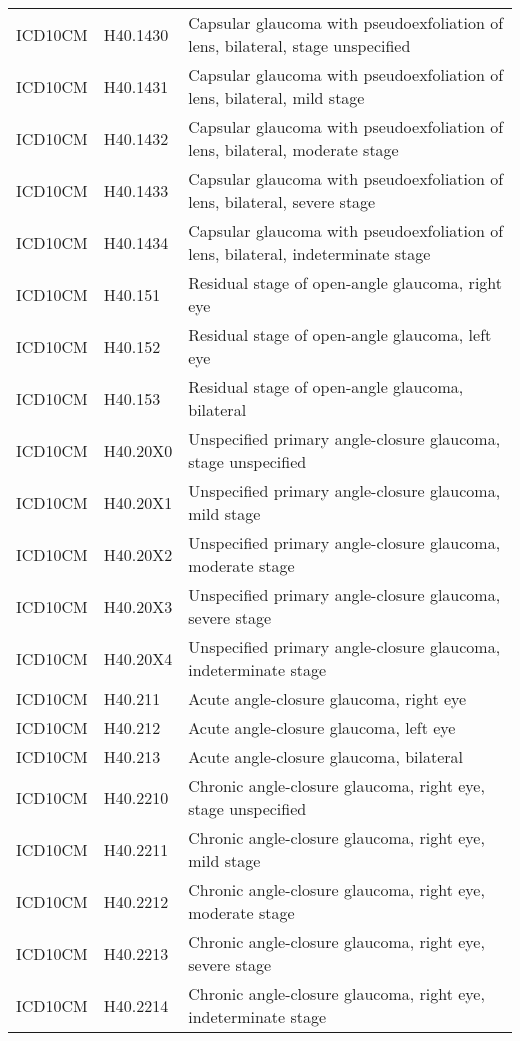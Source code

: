 \begin{longtable}{p{}p{}p{}}
  ICD10CM & H40.1430 & Capsular glaucoma with pseudoexfoliation of lens, bilateral, stage unspecified \\ 
  ICD10CM & H40.1431 & Capsular glaucoma with pseudoexfoliation of lens, bilateral, mild stage \\ 
  ICD10CM & H40.1432 & Capsular glaucoma with pseudoexfoliation of lens, bilateral, moderate stage \\ 
  ICD10CM & H40.1433 & Capsular glaucoma with pseudoexfoliation of lens, bilateral, severe stage \\ 
  ICD10CM & H40.1434 & Capsular glaucoma with pseudoexfoliation of lens, bilateral, indeterminate stage \\ 
  ICD10CM & H40.151 & Residual stage of open-angle glaucoma, right eye \\ 
  ICD10CM & H40.152 & Residual stage of open-angle glaucoma, left eye \\ 
  ICD10CM & H40.153 & Residual stage of open-angle glaucoma, bilateral \\ 
  ICD10CM & H40.20X0 & Unspecified primary angle-closure glaucoma, stage unspecified \\ 
  ICD10CM & H40.20X1 & Unspecified primary angle-closure glaucoma, mild stage \\ 
  ICD10CM & H40.20X2 & Unspecified primary angle-closure glaucoma, moderate stage \\ 
  ICD10CM & H40.20X3 & Unspecified primary angle-closure glaucoma, severe stage \\ 
  ICD10CM & H40.20X4 & Unspecified primary angle-closure glaucoma, indeterminate stage \\ 
  ICD10CM & H40.211 & Acute angle-closure glaucoma, right eye \\ 
  ICD10CM & H40.212 & Acute angle-closure glaucoma, left eye \\ 
  ICD10CM & H40.213 & Acute angle-closure glaucoma, bilateral \\ 
  ICD10CM & H40.2210 & Chronic angle-closure glaucoma, right eye, stage unspecified \\ 
  ICD10CM & H40.2211 & Chronic angle-closure glaucoma, right eye, mild stage \\ 
  ICD10CM & H40.2212 & Chronic angle-closure glaucoma, right eye, moderate stage \\ 
  ICD10CM & H40.2213 & Chronic angle-closure glaucoma, right eye, severe stage \\ 
  ICD10CM & H40.2214 & Chronic angle-closure glaucoma, right eye, indeterminate stage \\ 

\end{longtable}
